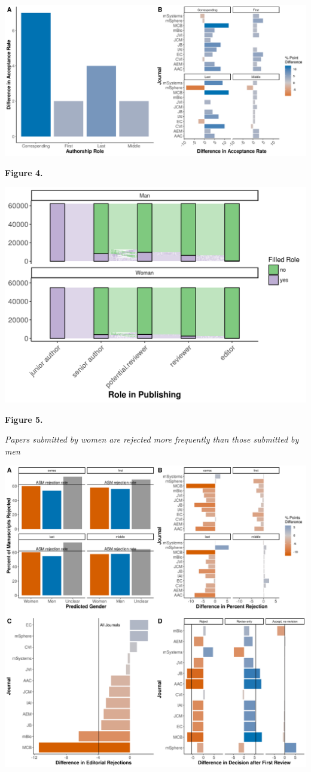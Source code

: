 \documentclass[11pt,]{article}
\begin{document}
\includegraphics{Figure_4.png}

\textbf{Figure 4.}

\includegraphics{Figure_5.png}

\textbf{Figure 5.}

\emph{Papers submitted by women are rejected more frequently than those
submitted by men}

\includegraphics{Figure_6.png}
\end{document}
